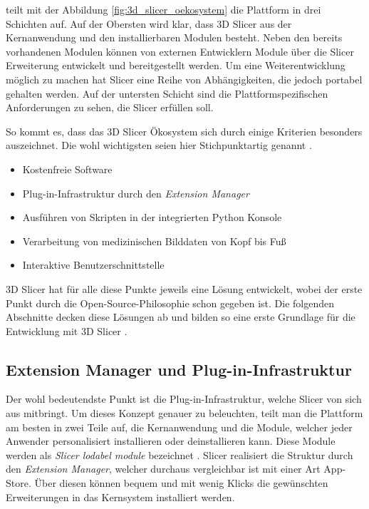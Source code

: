 \citet[S.~23]{fedorov2012slicer} teilt mit der Abbildung
\ref{fig:3d_slicer_oekosystem} die Plattform in drei Schichten auf. Auf der Obersten
wird klar, dass 3D Slicer aus der Kernanwendung und den installierbaren Modulen
besteht. Neben den bereits vorhandenen Modulen können von externen Entwicklern Module
über die Slicer Erweiterung entwickelt und bereitgestellt werden. Um eine
Weiterentwicklung möglich zu machen hat Slicer eine Reihe von Abhängigkeiten, die
jedoch portabel gehalten werden. Auf der untersten Schicht sind die
Plattformspezifischen Anforderungen zu sehen, die Slicer erfüllen soll.

So kommt es, dass das 3D Slicer Ökosystem sich durch einige Kriterien besonders
auszeichnet. Die wohl wichtigsten seien hier Stichpunktartig genannt \citep[vgl.][S.~11]{fedorov2012slicer}.

\begin{itemize}
	\item Kostenfreie Software

	\item Plug-in-Infrastruktur durch den \textit{Extension Manager}

	\item Ausführen von Skripten in der integrierten Python Konsole

	\item Verarbeitung von medizinischen Bilddaten von Kopf bis Fuß

	\item Interaktive Benutzerschnittstelle
\end{itemize}

3D Slicer hat für alle diese Punkte jeweils eine Lösung entwickelt, wobei der
erste Punkt durch die Open-Source-Philosophie schon gegeben ist. Die folgenden Abschnitte
decken diese Lösungen ab und bilden so eine erste Grundlage für die Entwicklung mit
3D Slicer \citep[vgl.][S.~11]{fedorov2012slicer}.

\subsection{Extension Manager und Plug-in-Infrastruktur}
Der wohl bedeutendste Punkt ist die Plug-in-Infrastruktur, welche Slicer von sich
aus mitbringt. Um dieses Konzept genauer zu beleuchten, teilt man die Plattform am
besten in zwei Teile auf, die Kernanwendung und die Module, welcher jeder Anwender
personalisiert installieren oder deinstallieren kann. Diese Module werden als
\textit{Slicer lodabel module} bezeichnet \citep[vgl.][S.~25]{fedorov2012slicer}.
Slicer realisiert die Struktur durch den \textit{Extension Manager}, welcher durchaus
vergleichbar ist mit einer Art App-Store. Über diesen können bequem und mit
wenig Klicks die gewünschten Erweiterungen in das Kernsystem installiert werden.

